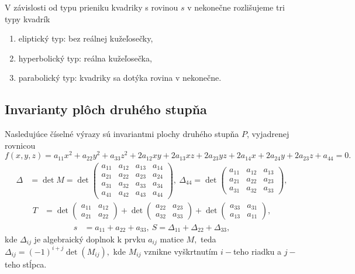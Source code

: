 
V závislosti od typu prieniku kvadriky s rovinou $s$ v nekonečne rozlišujeme tri typy kvadrík
\begin{enumerate}
\item eliptický typ: bez reálnej kužeľosečky,
\item hyperbolický typ: reálna kužeľosečka,
\item parabolický typ: kvadriky sa dotýka rovina v nekonečne.
\end{enumerate}
\subsection{Invarianty plôch druhého stupňa}
Nasledujúce číselné výrazy sú invariantmi plochy druhého stupňa $P$, vyjadrenej rovnicou 
\[ f(x, y, z) = a_{11}x^2 + a_{22}y^2 + a_{33}z^2 + 2a_{12}xy + 2a_{13}xz + 2a_{23}yz + 2a_{14}x + 2a_{24}y + 2a_{23}z + a_{44} = 0. \]
\begin{align*}
\Delta &= \det M = \det \begin{pmatrix} 
a_{11} & a_{12} & a_{13} & a_{14} \\ 
a_{21} & a_{22} & a_{23} & a_{24} \\
a_{31} & a_{32} & a_{33} & a_{34} \\
a_{41} & a_{42} & a_{43} & a_{44}
\end{pmatrix}, \
\Delta_{44} = \det \begin{pmatrix} 
a_{11} & a_{12} & a_{13} \\ 
a_{21} & a_{22} & a_{23} \\ 
a_{31} & a_{32} & a_{33}
\end{pmatrix},
\end{align*}
\begin{align*}
T &= \det \begin{pmatrix} 
a_{11} & a_{12} \\ 
a_{21} & a_{22} 
\end{pmatrix} + \det \begin{pmatrix} 
a_{22} & a_{23} \\ 
a_{32} & a_{33} 
\end{pmatrix} + \det \begin{pmatrix} 
a_{33} & a_{31} \\ 
a_{13} & a_{11} 
\end{pmatrix},
\end{align*}
\begin{align*}
s &= a_{11} + a_{22} + a_{33}, \ S = \Delta_{11} + \Delta_{22} + \Delta_{33}, 
\end{align*}
kde $ \Delta_{ij} $ je algebraický doplnok k prvku $a_{ij}$ matice $M, $ teda $\Delta_{ij} = (-1)^{i+j} \det(M_{ij}), $ kde $M_{ij}$ vznikne vyškrtnutím $i-$teho riadku a $j-$teho stĺpca.

